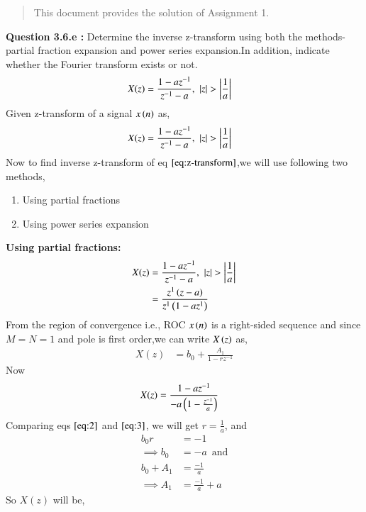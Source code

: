 \documentclass[journal,12pt,twocolumn]{IEEEtran}
\begin{document}
\begin{abstract}
This document provides the solution of Assignment 1.
\end{abstract}
\textbf{Question 3.6.e :} Determine the inverse z-transform using both the methods- partial fraction expansion and power series expansion.In addition, indicate whether the Fourier transform exists or not.
  \begin{align}
    X(z) &= \frac{1-az^{-1}}{z^{-1} - a} , \, \, \left\vert z\right\vert > \left\vert\frac{1}{a}\right\vert
  \end{align}
 \solution Given z-transform of a signal $x\left(n\right)$ as,
   \begin{align}
     X(z) &= \frac{1-az^{-1}}{z^{-1} - a} , \, \, \left\vert z\right\vert > \left\vert\frac{1}{a}\right\vert\label{eq:z-transform}
   \end{align}
  Now to find inverse z-transform of eq $\eqref{eq:z-transform}$,we will use following two methods,
   \begin{enumerate}
    \item Using partial fractions
    \item Using power series expansion
   \end{enumerate}
   \textbf{Using partial fractions:} \\
     \begin{align}
      X(z) &= \frac{1-az^{-1}}{z^{-1} - a} , \, \, \left\vert z\right\vert > \left\vert\frac{1}{a}\right\vert \\
         &= \frac{z^1\left(z-a\right)}{z^1\left(1-az^1\right)} 
     \end{align}
    From the region of convergence i.e., ROC $x\left(n\right)$ is a right-sided sequence and since $M = N = 1$ and pole is first order,we can write $X\left(z\right)$ as,
     \begin{align}
      X(z) &= b_{0} + \frac{A_{1}}{1-rz^{-1}} \label{eq:2}
     \end{align}
    Now 
     \begin{align}
       X(z) &= \frac{1 - az^{-1}}{-a\left(1 - \frac{z^{-1}}{a}\right)}\label{eq:3}
     \end{align}   
    Comparing eqs $\eqref{eq:2}$ and $\eqref{eq:3}$, we will get $r = \frac{1}{a}$, and 
     \begin{align}
       b_{0}r &= -1 \\
       \implies b_{0} &= -a \, \, \,  \text{and}\\ 
       b_{0} + A_{1} &= \frac{-1}{a} \\
       \implies A_{1} &= \frac{-1}{a} + a
     \end{align}
    So $X(z)$ will be,
\end{document}
